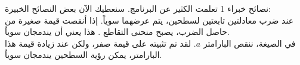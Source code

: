 \begin{surferPage}{نصائح خبراء 1}
تعلمت الكثير عن البرنامج. سنعطيك الآن بعض النصائح الخبيرة:\\
\vspace{0.3cm}
عند ضرب معادلتين تابعتين لسطحين، يتم عرضهما سوياً. إذا أنقصت قيمة صغيرة من حاصل الضرب، يصبح منحنى التقاطع . هذا يعني أن يندمجان سوياً.\\
\vspace{0.3cm}
في الصيغة، ننقص البارامتر $a$. لقد تم تثبيته على قيمة صفر، ولكن عند زيادة قيمة هذا البارامتر، يمكن رؤية السطحين يندمجان سوياً.
\end{surferPage}
